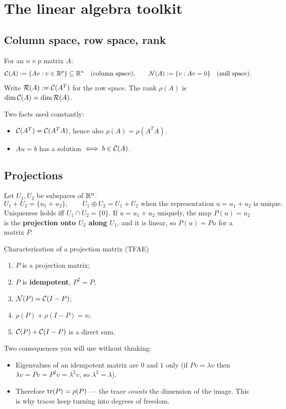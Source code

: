 \documentclass[11pt]{article}
\begin{document}
\section{The linear algebra toolkit}

\subsection{Column space, row space, rank}

For an $n\times p$ matrix $A$:
\[
  \mathcal{C}(A) := \{Av : v\in\mathbb{R}^p\}\subseteq\mathbb{R}^n \quad(\text{column space}),\qquad
  \mathcal{N}(A):=\{v: Av=0\} \quad(\text{null space}).
\]
Write $\mathcal{R}(A):=\mathcal{C}(A^T)$ for the row space. The rank $\rho(A)$ is
$\dim\mathcal{C}(A)=\dim\mathcal{R}(A)$.

Two facts used constantly:
\begin{itemize}
  \item $\mathcal{C}(A^T)=\mathcal{C}(A^TA)$, hence also $\rho(A)=\rho(A^TA)$.
  \item $Au=b$ has a solution $\iff b\in\mathcal{C}(A)$.
\end{itemize}

\subsection{Projections}

Let $U_1,U_2$ be subspaces of $\mathbb{R}^n$.
\[
  U_1+U_2=\{u_1+u_2\}, \qquad
  U_1\oplus U_2 = U_1+U_2 \text{ when the representation } u=u_1+u_2 \text{ is unique}.
\]
Uniqueness holds iff $U_1\cap U_2=\{0\}$. If $u=u_1+u_2$ uniquely, the map $P(u)=u_2$ is
the \textbf{projection onto $U_2$ along $U_1$}, and it is linear, so $P(u)=Pu$ for a matrix $P$.

\begin{idea}{Characterisation of a projection matrix (TFAE)}
\begin{enumerate}[label=(\roman*)]
  \item $P$ is a projection matrix;
  \item $P$ is \textbf{idempotent}, $P^2=P$;
  \item $\mathcal{N}(P)=\mathcal{C}(I-P)$;
  \item $\rho(P)+\rho(I-P)=n$;
  \item $\mathcal{C}(P)+\mathcal{C}(I-P)$ is a direct sum.
\end{enumerate}
\end{idea}

Two consequences you will use without thinking:
\begin{itemize}
  \item Eigenvalues of an idempotent matrix are $0$ and $1$ only (if $Pv=\lambda v$ then
        $\lambda v=Pv=P^2v=\lambda^2 v$, so $\lambda^2=\lambda$).
  \item Therefore $\operatorname{tr}(P)=\rho(P)$ --- the trace \emph{counts} the dimension of the image.
        This is why traces keep turning into degrees of freedom.
\end{itemize}
\end{document}
